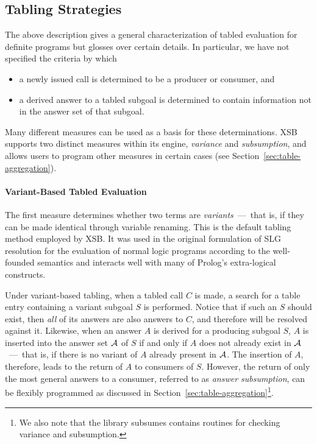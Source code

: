 
\subsection{Tabling Strategies}
\label{sec:TablingStrategies}

The above description gives a general characterization of tabled
evaluation for definite programs but glosses over certain details.  In
particular, we have not specified the criteria by which
\begin{itemize}
\item a newly issued call is determined to be a producer or consumer, and
\item a derived answer to a tabled subgoal is determined to contain
information not in the answer set of that subgoal.
\end{itemize}
Many different measures can be used as a basis for these
determinations.  XSB supports two distinct measures within its engine,
{\em variance} and {\em subsumption}, and allows users to program
other measures in certain cases (see Section~\ref{sec:table-aggregation}).


\paragraph{Variant-Based Tabled Evaluation}
The first measure determines whether two terms are
\emph{variants}~---~that is, if they can be made identical through
variable renaming.  This is the default tabling method employed by
XSB\@.  It was used in the original formulation of SLG resolution
\cite{ChWa96} for the evaluation of normal logic programs according to
the well-founded semantics and interacts well with many of Prolog's
extra-logical constructs.

Under variant-based tabling, when a tabled call $C$ is made, a search
for a table entry containing a variant subgoal $S$ is performed.  Notice
that if such an $S$ should exist, then \emph{all} of its answers are
also answers to $C$, and therefore will be resolved against it.
Likewise, when an answer $A$ is derived for a producing subgoal $S$,
$A$ is inserted into the answer set ${\cal A}$ of $S$ if and only if $A$
does not already exist in ${\cal A}$~---~that is, if there is no variant of
$A$ already present in ${\cal A}$\@.  The insertion of $A$, therefore,
leads to the return of $A$ to consumers of $S$\@.  However, the return
of only the most general answers to a consumer, referred to as
\emph{answer subsumption}, can be flexibly programmed as discussed in
Section~{\ref{sec:table-aggregation}}\footnote{We also note that the
library {\sf subsumes} contains routines for checking variance and
subsumption.}.

